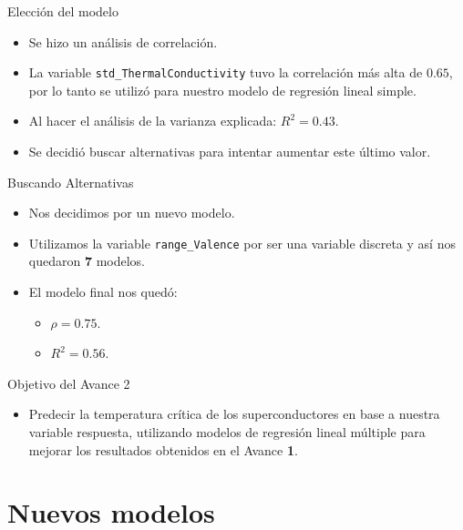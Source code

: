 \documentclass[11pt]{beamer}
\newcommand{\cod}[1]{\texttt{\frenchspacing#1}}
\begin{document}
\begin{frame}{Elección del modelo}
	\begin{itemize}
		\item Se hizo un análisis de correlación.
		\pause
		\item La variable \cod{std\_ThermalConductivity} tuvo la correlación más alta de $\mathbf{0.65}$, por lo tanto se utilizó para nuestro modelo de regresión lineal simple.
		\pause
		\item Al hacer el análisis de la varianza explicada: $R^2=\mathbf{0.43}$.
		\pause
		\item Se decidió buscar alternativas para intentar aumentar este último valor.
	\end{itemize}
\end{frame}

\begin{frame}{Buscando Alternativas}
	\begin{itemize}
		\item  Nos decidimos por un nuevo modelo.
		\pause
		\item  Utilizamos la variable \cod{range\_Valence} por ser una variable discreta y así nos quedaron \textbf{7} modelos.
		\pause
		\item  El modelo final nos quedó:
		\begin{itemize}
			\pause
			\item  $\rho = \mathbf{0.75}$.
			\pause
			\item  $R^2 = \mathbf{0.56}$.
		\end{itemize}
	\end{itemize}
\end{frame}

\begin{frame}{Objetivo del Avance 2}
	\begin{itemize}
		\item Predecir la temperatura crítica de los superconductores en base a nuestra variable respuesta, utilizando modelos de regresión lineal múltiple para mejorar los resultados obtenidos en el Avance \textbf{1}.
	\end{itemize}
\end{frame}


\section{Nuevos modelos}
\end{document}

